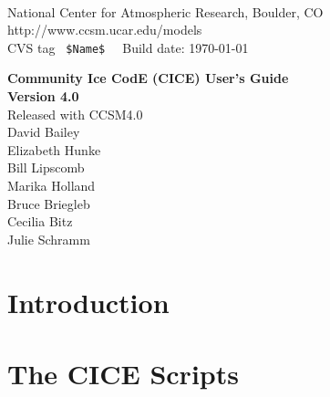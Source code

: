 \documentclass[]{article}
\begin{document}

 \newenvironment{Ventry}[1]%
   {\begin{list}{}{\renewcommand{\makelabel}[1]{\textsf{##1:}\hfil}%
      \settowidth{\labelwidth}{\textsf{#1:}}%
      \setlength{\leftmargin}{1.5cm}%
      \setlength{\labelwidth}{1.0cm}%
      \setlength{\itemsep}{0pt}%
      \setlength{\parsep}{0pt}}}%
   {\end{list}}

\begin{titlepage}

 \\
\noindent National Center for Atmospheric Research, Boulder, CO \\
\noindent http://www.ccsm.ucar.edu/models \\
\noindent CVS tag \verb+ $Name$  +  Build date: \today \\
\vspace{2in}

\begin{center}
{\Large
  {\bf Community Ice CodE (CICE) User's Guide} \\
  {\bf Version 4.0} \\
  \vspace{0.2in}
  {Released with CCSM4.0} \\
  \vspace{0.5in}
  David Bailey \\
  Elizabeth Hunke \\
  Bill Lipscomb \\
  Marika Holland \\
  Bruce Briegleb \\
  Cecilia Bitz  \\
  Julie Schramm \\
}
\end{center}

\end{titlepage}

\tableofcontents

\newpage
\section{Introduction}
  

\section{The CICE Scripts}
    
\end{document}
